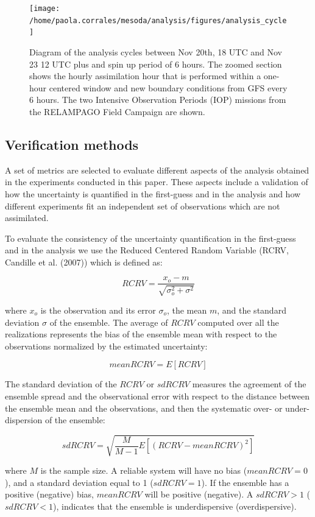 \documentclass[final,5p,times,twocolumn,authoryear]{elsarticle} %
\begin{document}
\begin{figure}
\texttt{[image: /home/paola.corrales/mesoda/analysis/figures/analysis\_cycle]} \caption{Diagram of the analysis cycles between Nov 20th, 18 UTC and Nov 23 12 UTC plus and spin up period of 6 hours. The zoomed section shows the hourly assimilation hour that is performed within a one-hour centered window and new boundary conditions from GFS every 6 hours. The two Intensive Observation Periods (IOP) missions from the RELAMPAGO Field Campaign are shown.}\label{fig:cycle}
\end{figure}

\hypertarget{verification-methods}{%
\subsection{Verification methods}\label{verification-methods}}

A set of metrics are selected to evaluate different aspects of the analysis obtained in the experiments conducted in this paper. These aspects include a validation of how the uncertainty is quantified in the first-guess and in the analysis and how different experiments fit an independent set of observations which are not assimilated.

To evaluate the consistency of the uncertainty quantification in the first-guess and in the analysis we use the Reduced Centered Random Variable (RCRV, Candille et al. (2007)) which is defined as:

\[RCRV = \frac{x_o - m}{\sqrt{\sigma_o^2 + \sigma^2}}\]

where \(x_o\) is the observation and its error \(\sigma_o\), the mean \(m\), and the standard deviation \(\sigma\) of the ensemble.
The average of \(RCRV\) computed over all the realizations represents the bias of the ensemble mean with respect to the observations normalized by the estimated uncertainty:

\[\mathit{mean RCRV} = E[RCRV]\]

The standard deviation of the \(RCRV\) or \(sd RCRV\) measures the agreement of the ensemble spread and the observational error with respect to the distance between the ensemble mean and the observations, and then the systematic over- or under- dispersion of the ensemble:

\[\mathit{sd RCRV} = \sqrt{\frac{M}{M -1}E[(\mathit{RCRV} - \mathit{mean RCRV})^2]}\]

where \(M\) is the sample size. A reliable system will have no bias (\(mean RCRV = 0\)), and a standard deviation equal to 1 (\(sd RCRV = 1\)). If the ensemble has a positive (negative) bias, \(mean RCRV\) will be positive (negative). A \(sd RCRV > 1\) (\(sd RCRV < 1\)), indicates that the ensemble is underdispersive (overdispersive).
\end{document}
